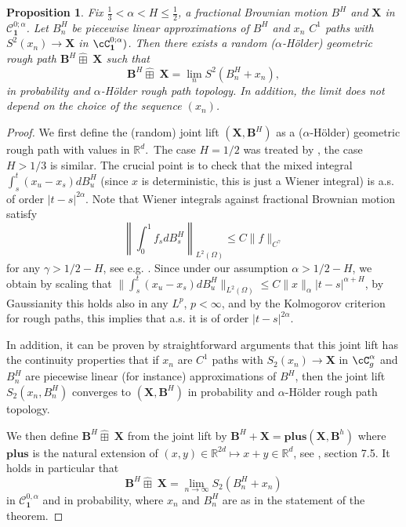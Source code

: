 \documentclass[12pt,a4paper]{article}
\numberwithin{equation}{section}
\def\bR{\mathbb{R}}\def\bS{\mathbb{S}}
\def\fX{\mathbf{X}}
\def\fB{\mathbf{B}}
\theoremstyle{plain}
\newtheorem{proposition}[theorem]{Proposition}
\theoremstyle{definition}
\theoremstyle{remark}
\begin{document}
\begin{proposition}
Fix $\frac 1 3 < \alpha < H \leq \frac 1 2$, a fractional Brownian motion $B^H$ and $\fX$ in $\mathcal{C}^{0;\alpha}_{\mathbf{1}}$. Let $B_n^H$ be piecewise linear approximations of $B^H$ and $x_n$  $C^1$ paths with $S^2(x_n) \to \fX$ in $\cC^{0;\alpha}_{\mathbf 1})$. Then there exists a random ($\alpha$-H\"older) geometric rough path $\fB^H \widehat{\boxplus}\;  \fX$ such that
\begin{equation}
\fB^H \widehat{\boxplus}\;  \fX = \lim_n S^2(B_n^H +x_n),
\end{equation}
in probability and $\alpha$-H\"older rough path topology. In addition, the limit does not depend on the choice of the sequence $(x_n)$.
\end{proposition}

\begin{proof}
We first define the (random) joint lift  $(\fX,\fB^H)$ as a ($\alpha$-H\"older) geometric rough path with values in $\bR^d$.\ The case $H=1/2$ was treated by \cite{DOR15}, the case $H> 1/3$ is similar. The crucial point is to check that the mixed integral $\int_s^t (x_u - x_s) dB^H_u$ (since $x$ is deterministic, this is just a Wiener integral)  is a.s. of order $|t-s|^{2\alpha}$. Note that Wiener integrals against fractional Brownian motion satisfy 
\[
\left\| \int_0^1 f_s dB^H_s \right\|_{L^2(\Omega)} \leq C \|f \|_{C^{\gamma}}
\]
for any $\gamma > 1/2 - H$, see e.g. \cite[Theorem 1.9.9]{Mishura2008}. Since under our assumption $\alpha > 1/2-H$, we obtain by scaling that $\|\int_s^t (x_u - x_s) dB^H_u \|_{L^2(\Omega)} \leq C \|x\|_{\alpha} |t-s|^{\alpha+H}$, by Gaussianity this holds also in any $L^p$, $p<\infty$, and by the Kolmogorov criterion for rough paths, this implies that a.s. it is of order $|t-s|^{2\alpha}$.

In addition, it can be proven by straightforward arguments that this joint lift has the continuity properties that if $x_n$ are $C^1$ paths with $S_2(x_n) \to \fX$ in $\cC^{\alpha}_g$ and $B_n^H$ are piecewise linear (for instance) approximations of $B^H$, then the joint lift $S_{2}(x_n,B_n^H)$ converges to $(\fX,\fB^H)$ in probability and $\alpha$-H\"older rough path topology.

We then define $\fB^H \widehat\boxplus\;  \fX$  from the joint lift by $\fB^H +\fX = \textbf{plus}(\fX,\fB^h)$ where $\textbf{plus}$ is the natural extension of $(x,y) \in \bR^{2d} \mapsto x+y \in \bR^d$, see \cite{frizbook}, section 7.5. It holds in particular that
\[
 \fB^H \widehat\boxplus \; \fX = \lim_{n \to \infty} S_{2}(B^H_n+x_n)
\]
in $\mathcal{C}^{0,\alpha}_{\mathbf{1}} $ and in probability, where $x_n$ and $B^H_n$ are as in the statement of the theorem.
\end{proof}
\end{document}
